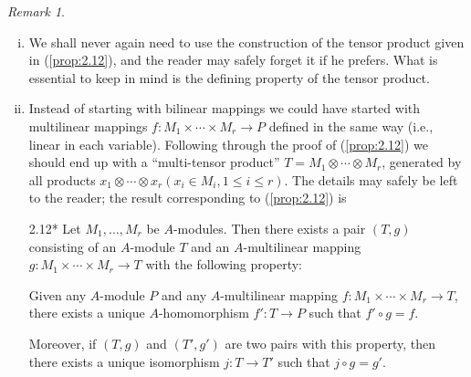\documentclass{standalone}
\theoremstyle{definition}
\theoremstyle{remark}
\newtheorem*{remark}{Remark}
\begin{document}
\begin{remark}
\begin{enumerate}[i)]
However, there is the following result:
\begin{corollary}
  \label{coro:2.13}
  Let $x_{i} \in M, y_{i} \in N$ be such that
$\sum x_{i} \otimes y_{i}=0$ in $M \otimes N$. Then there exist finitely
generated submodules $M_{0}$ of $M$ and $N_{0}$ of $N$ such that
$\sum x_{i} \otimes y_{i}=0$ in $M_{0} \otimes N_{0}$.
\end{corollary}
\begin{proof}
  If $\sum x_{i} \otimes y_{i}=0$ in $M \otimes N$, then in the notation of
the proof of (\ref{prop:2.12}) we have $\sum(x_{i}, y_{i}) \in D$, and therefore
$\sum(x_{i}, y_{i})$ is a finite sum of generators of $D$. Let
$M_{0}$ be the submodule of $M$ generated by the $x_{i}$ and all the elements of
$M$ which occur as first coordinates in these generators of $D$, and define
$N_{0}$ similarly. Then $\sum x_{i} \otimes y_{i}=0$ as an element of
$M_{0} \otimes N_{0}$.
\end{proof}
\item We shall never again need to use the construction of the tensor product
given in (\ref{prop:2.12}), and the reader may safely forget it if he prefers. What is
essential to keep in mind is the defining property of the tensor product. 
\item Instead of starting with bilinear mappings we could have started with
multilinear mappings $f: M_{1} \times \cdots \times M_{r} \to P$ defined in the
same way (i.e., linear in each variable). Following through the proof
of (\ref{prop:2.12}) 
we should end up with a ``multi-tensor product''
$T=M_{1} \otimes \cdots \otimes M_{r}$, generated by all products
$x_{1} \otimes \cdots \otimes x_{r}(x_{i} \in M_{i}, 1 \leq i \leq r)$.
The details may safely be left to the reader; the result corresponding
to (\ref{prop:2.12}) is
\begin{thprop}{2.12*}\label{prop:2.12a}
Let $M_{1}, \ldots, M_{r}$ be $A$-modules. Then there
exists a pair $(T, g)$ consisting of an $A$-module $T$ and an $A$-multilinear
mapping $g: M_{1} \times \cdots\times M_{r} \to T$ with the following
property:

Given any $A$-module $P$ and any $A$-multilinear mapping $f: M_{1} \times
\cdots\times M_{r} \to T$, there exists a unique $A$-homomorphism $f': T
\to P$ such that $f' \circ g=f$.

Moreover, if $(T, g)$ and $(T', g')$ are two pairs with this
property, then there exists a unique isomorphism $j: T \to T'$ such that
$j \circ g=g'$.  
\end{thprop}
\end{enumerate}
\end{remark}
\end{document}
